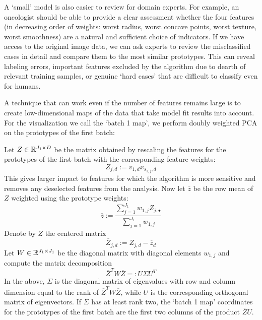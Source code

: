 %
A `small' model is also easier to review for domain experts.
For example, an oncologist should be able to provide a clear assessment whether the four features (in decreasing order of weights: worst radius, worst concave points, worst texture, worst smoothness) are a natural and sufficient choice of indicators.
If we have access to the original image data, we can ask experts to review the misclassified cases in detail and compare them to the most similar prototypes.
This can reveal labeling errors, important features excluded by the algorithm due to dearth of relevant training samples, or genuine `hard cases' that are difficult to classify even for humans.\par
%
A technique that can work even if the number of features remains large is to create low-dimensional maps of the data that take model fit results into account.
For the visualization we call the `batch 1 map', we perform doubly weighted PCA on the prototypes of the first batch:\par
%
Let $Z\in\mathbb{R}^{J_1\times D}$ be the matrix obtained by rescaling the features for the prototypes of the first batch with the corresponding feature weights:
%
\begin{equation}
Z_{j,d}:=v_{1,d}x_{s_{1,j},d}\label{eq_scaled_x}
\end{equation}
%
This gives larger impact to features for which the algorithm is more sensitive and removes any deselected features from the analysis.
Now let $\overline{z}$ be the row mean of $Z$ weighted using the prototype weights:
%
\begin{equation}
\overline{z}:=\frac{\sum_{j=1}^{J_1}w_{1,j}Z_{j,\bullet}}
{\sum_{j=1}^{J_1}w_{1,j}}\label{eq_weighted_mean}
\end{equation}
%
Denote by $\overline{Z}$ the centered matrix
%
\begin{equation}
\overline{Z}_{j,d}:=Z_{j,d}-\overline{z}_d\label{eq_centered_Z}
\end{equation}
%
Let $W\in\mathbb{R}^{J_1\times J_1}$ be the diagonal matrix with diagonal elements $w_{1,j}$ and compute the matrix decomposition
%
\begin{equation}
\overline{Z}^TW\overline{Z}=:U\Sigma U^T\label{eq_weighted_svd}
\end{equation}
%
In the above, $\Sigma$ is the diagonal matrix of eigenvalues with row and column dimension equal to the rank of $\overline{Z}^TW\overline{Z}$, while $U$ is the corresponding orthogonal matrix of eigenvectors.
If $\Sigma$ has at least rank two, the `batch 1 map' coordinates for the prototypes of the first batch are the first two columns of the product $\overline{Z}U$.

